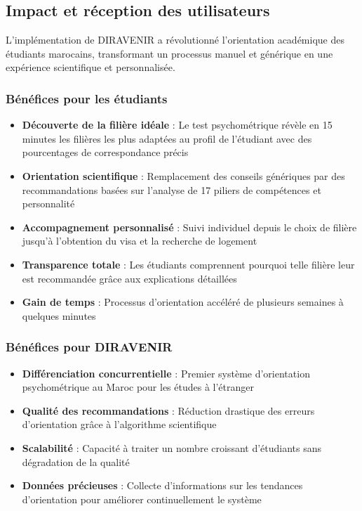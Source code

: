 \documentclass[12pt,a4paper]{report}
\begin{document}
\subsection{Impact et réception des utilisateurs}

L'implémentation de DIRAVENIR a révolutionné l'orientation académique des étudiants marocains, transformant un processus manuel et générique en une expérience scientifique et personnalisée.

\subsubsection{Bénéfices pour les étudiants}

\begin{itemize}
    \item \textbf{Découverte de la filière idéale} : Le test psychométrique révèle en 15 minutes les filières les plus adaptées au profil de l'étudiant avec des pourcentages de correspondance précis
    \item \textbf{Orientation scientifique} : Remplacement des conseils génériques par des recommandations basées sur l'analyse de 17 piliers de compétences et personnalité
    \item \textbf{Accompagnement personnalisé} : Suivi individuel depuis le choix de filière jusqu'à l'obtention du visa et la recherche de logement
    \item \textbf{Transparence totale} : Les étudiants comprennent pourquoi telle filière leur est recommandée grâce aux explications détaillées
    \item \textbf{Gain de temps} : Processus d'orientation accéléré de plusieurs semaines à quelques minutes
\end{itemize}

\subsubsection{Bénéfices pour DIRAVENIR}

\begin{itemize}
    \item \textbf{Différenciation concurrentielle} : Premier système d'orientation psychométrique au Maroc pour les études à l'étranger
    \item \textbf{Qualité des recommandations} : Réduction drastique des erreurs d'orientation grâce à l'algorithme scientifique
    \item \textbf{Scalabilité} : Capacité à traiter un nombre croissant d'étudiants sans dégradation de la qualité
    \item \textbf{Données précieuses} : Collecte d'informations sur les tendances d'orientation pour améliorer continuellement le système
\end{itemize}
\end{document}
